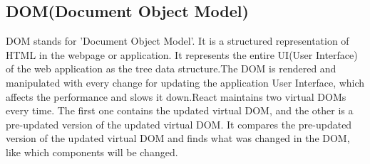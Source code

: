 \begin{enumerate}
\subsection*{DOM(Document Object Model)}DOM stands for 'Document Object Model'. It is a structured representation of HTML in the webpage or application. It represents the entire UI(User Interface) of the web application as the tree data structure.The DOM is rendered and manipulated with every change for updating the application User Interface, which affects the performance and slows it down.React maintains two virtual DOMs every time. The first one contains the updated virtual DOM, and the other is a pre-updated version of the updated virtual DOM. It compares the pre-updated version of the updated virtual DOM and finds what was changed in the DOM, like which components will be changed.
\end{enumerate}
\newpage






